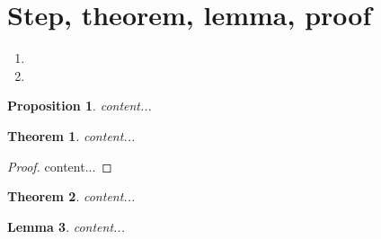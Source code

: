 \documentclass[]{article}
\newtheorem{thm}{Theorem}[section]
\newtheorem{lem}[thm]{Lemma}
\newtheorem{mypro}{Proposition}
\begin{document}
\section{Step, theorem, lemma, proof}
\begin{enumerate}[Step 1]
\item 
\item 
\end{enumerate}
\begin{mypro}	content...\end{mypro}
\begin{thm}	content...\end{thm}
\begin{proof}[Proof]
content...
\end{proof}
\begin{thm}content...\end{thm}
\begin{lem}	content...\end{lem}
\end{document}
